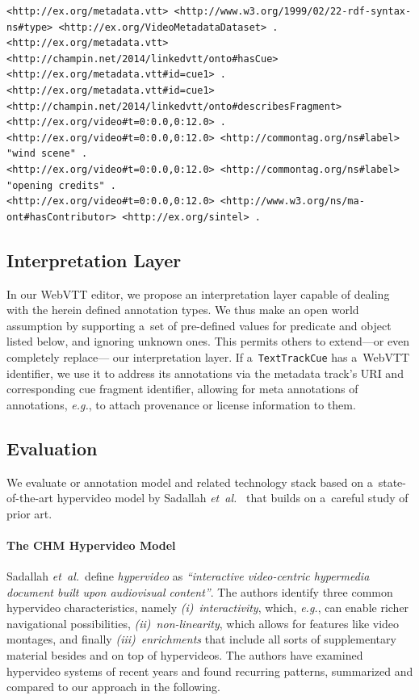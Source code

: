 \documentclass{sig-alternate}
\def\JSONLD{\mbox{JSON-LD}}
\begin{document}
\begin{lstlisting}[caption={RDF triples based on the \JSONLD\ code from \autoref{listing:jsonld}},
  label=listing:rdftriples, float=t!]
<http://ex.org/metadata.vtt> <http://www.w3.org/1999/02/22-rdf-syntax-ns#type> <http://ex.org/VideoMetadataDataset> .
<http://ex.org/metadata.vtt> <http://champin.net/2014/linkedvtt/onto#hasCue> <http://ex.org/metadata.vtt#id=cue1> .
<http://ex.org/metadata.vtt#id=cue1> <http://champin.net/2014/linkedvtt/onto#describesFragment> <http://ex.org/video#t=0:0.0,0:12.0> .
<http://ex.org/video#t=0:0.0,0:12.0> <http://commontag.org/ns#label> "wind scene" .
<http://ex.org/video#t=0:0.0,0:12.0> <http://commontag.org/ns#label> "opening credits" .
<http://ex.org/video#t=0:0.0,0:12.0> <http://www.w3.org/ns/ma-ont#hasContributor> <http://ex.org/sintel> .
\end{lstlisting}
  
\subsection{Interpretation Layer}

In our WebVTT editor,
we propose an interpretation layer
capable of dealing with the herein defined annotation types. 
We thus make an open world assumption
by supporting a~set of pre-defined values for predicate and object
listed below, and ignoring unknown ones.
This permits others to extend---or even completely replace---%
our interpretation layer.
If a~\texttt{TextTrackCue} has a~WebVTT identifier,
we use it to address its annotations
via the metadata track's URI
and corresponding cue fragment identifier,
allowing for meta annotations of annotations, \emph{e.g.},
to attach provenance or license information to them.

\subsection{Evaluation}

We evaluate or annotation model and related technology stack
based on a~state-of-the-art hypervideo model by
Sadallah \emph{et~al.}~\cite{sadallah2012hypervideo}
that builds on a~careful study of prior art.

\paragraph{The CHM Hypervideo Model}

Sadallah \emph{et~al.}\ define
\emph{hypervideo} as \textit{``interactive video-centric
hypermedia document built upon audiovisual content''}.
The authors identify three common hypervideo characteristics,\linebreak
namely \emph{(i)}~\emph{interactivity}, which, \emph{e.g.},
can enable richer navigational possibilities,
\emph{(ii)}~\emph{non-linearity}, which allows for features
like video montages, and finally \emph{(iii)}~\emph{enrichments}
that include all sorts of supplementary material besides
and on top of hypervideos.
The authors have examined hypervideo systems
of recent years and found recurring patterns,
summarized and compared to our approach
in the following.\\
\end{document}
